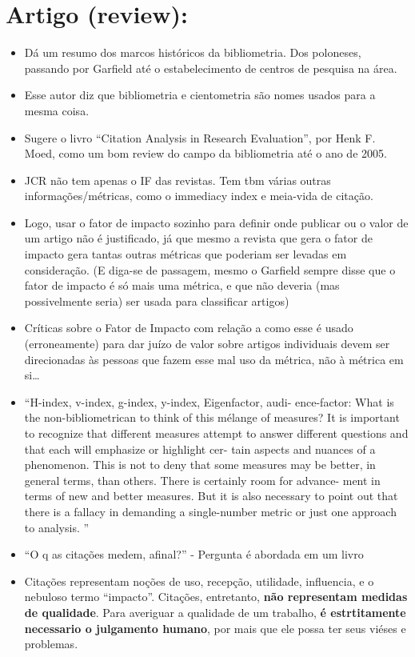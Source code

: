 \documentclass[11pt]{article}
\begin{document}
\section{Artigo (review): \cite{pendlebury2009}}
\label{sec:org63f95b4}

\begin{itemize}
\item Dá um resumo dos marcos históricos da bibliometria. Dos poloneses, passando por Garfield até o estabelecimento de centros de pesquisa na área.
\item Esse autor diz que bibliometria e cientometria são nomes usados para a mesma coisa.
\item Sugere o livro ``Citation Analysis in Research Evaluation'', por Henk F. Moed, como um bom review do campo da bibliometria até o ano de 2005.
\item JCR não tem apenas o IF das revistas. Tem tbm várias outras informações/métricas, como o immediacy index e meia-vida de citação.
\item Logo, usar o fator de impacto sozinho para definir onde publicar ou o valor de um artigo não é justificado, já que mesmo a revista que gera o fator de impacto gera tantas outras métricas que poderiam ser levadas em consideração. (E diga-se de passagem, mesmo o Garfield sempre disse que o fator de impacto é só mais uma métrica, e que não deveria (mas possivelmente seria) ser usada para classificar artigos)
\item Críticas sobre o Fator de Impacto com relação a como esse é usado (erroneamente) para dar juízo de valor sobre artigos individuais devem ser direcionadas às pessoas que fazem esse mal uso da métrica, não à métrica em si\ldots{}
\item ``H-index, v-index, g-index, y-index, Eigenfactor, audi- ence-factor: What is the non-bibliometrican to think of this mélange of measures? It is important to recognize that different measures attempt to answer different questions and that each will emphasize or highlight cer- tain aspects and nuances of a phenomenon. This is not to deny that some measures may be better, in general terms, than others. There is certainly room for advance- ment in terms of new and better measures. But it is also necessary to point out that there is a fallacy in demanding a single-number metric or just one approach to analysis. ''
\item ``O q as citações medem, afinal?'' - Pergunta é abordada em um livro \cite{moed2006}
\item Citações representam noções de uso, recepção, utilidade, influencia, e o nebuloso termo ``impacto''. Citações, entretanto, \textbf{não representam medidas de qualidade}. Para averiguar a qualidade de um trabalho, \textbf{é estrtitamente necessario o julgamento humano}, por mais que ele possa ter seus viéses e problemas.
\end{itemize}
\end{document}
